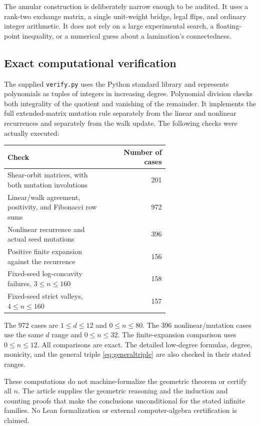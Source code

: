\documentclass[11pt,letterpaper]{article}
\numberwithin{equation}{section}
\theoremstyle{definition}
\begin{document}
The annular construction is deliberately narrow enough to be audited. It
uses a rank-two exchange matrix, a single unit-weight bridge, legal flips,
and ordinary integer arithmetic. It does not rely on a large experimental
search, a floating-point inequality, or a numerical guess about a lamination's
connectedness.

\subsection{Exact computational verification}

The supplied \texttt{verify.py} uses the Python standard library and represents
polynomials as tuples of integers in increasing degree. Polynomial division
checks both integrality of the quotient and vanishing of the remainder.
It implements the full extended-matrix mutation rule separately from the
linear and nonlinear recurrences and separately from the walk update.
The following checks were actually executed:
\begin{center}
\small
\begin{tabular}{p{0.64\linewidth}r}
\toprule
Check & Number of cases\\
\midrule
Shear-orbit matrices, with both mutation involutions & 201\\
Linear/walk agreement, positivity, and Fibonacci row sums & 972\\
Nonlinear recurrence and actual seed mutations & 396\\
Positive finite expansion against the recurrence & 156\\
Fixed-seed log-concavity failures, $3\leq n\leq160$ & 158\\
Fixed-seed strict valleys, $4\leq n\leq160$ & 157\\
\bottomrule
\end{tabular}
\end{center}
The 972 cases are $1\leq d\leq12$ and $0\leq n\leq80$. The 396
nonlinear/mutation cases use the same $d$ range and $0\leq n\leq32$.
The finite-expansion comparison uses $0\leq n\leq12$. All comparisons are
exact. The detailed low-degree formulas, degree, monicity, and the general
triple \eqref{eq:generaltriple} are also checked in their stated ranges.

These computations do not machine-formalize the geometric theorem or certify
all $n$. The article supplies the geometric reasoning and the induction and
counting proofs that make the conclusions unconditional for the stated
infinite families. No Lean formalization or external computer-algebra
certification is claimed.
\end{document}

